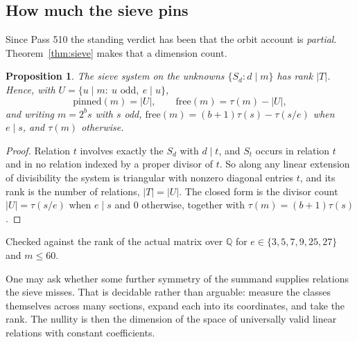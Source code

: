 \documentclass[11pt]{article}
\theoremstyle{plain}
\newtheorem{proposition}[theorem]{Proposition}
\theoremstyle{definition}
\newcommand{\QQ}{\mathbb Q}
\begin{document}
\subsection{How much the sieve pins}

Since Pass 510 the standing verdict has been that the orbit account is
\emph{partial}. Theorem~\ref{thm:sieve} makes that a dimension count.

\begin{proposition}\label{prop:rank}
The sieve system on the unknowns $\{S_d:d\mid m\}$ has rank $\lvert T\rvert$.
Hence, with $U=\{u\mid m:\ u \text{ odd},\ e\mid u\}$,
\[
\mathrm{pinned}(m)=\lvert U\rvert,\qquad
\mathrm{free}(m)=\tau(m)-\lvert U\rvert ,
\]
and writing $m=2^{b}s$ with $s$ odd,
$\mathrm{free}(m)=(b+1)\tau(s)-\tau(s/e)$ when $e\mid s$, and $\tau(m)$
otherwise.
\end{proposition}

\begin{proof}
Relation $t$ involves exactly the $S_d$ with $d\mid t$, and $S_t$ occurs in
relation $t$ and in no relation indexed by a proper divisor of $t$. So along
any linear extension of divisibility the system is triangular with nonzero
diagonal entries $t$, and its rank is the number of relations, $\lvert
T\rvert=\lvert U\rvert$. The closed form is the divisor count
$\lvert U\rvert=\tau(s/e)$ when $e\mid s$ and $0$ otherwise, together with
$\tau(m)=(b+1)\tau(s)$.
\end{proof}

\noindent Checked against the rank of the actual matrix over $\QQ$ for
$e\in\{3,5,7,9,25,27\}$ and $m\le60$.

One may ask whether some further symmetry of the summand supplies relations the
sieve misses. That is decidable rather than arguable: measure the classes
themselves across many sections, expand each into its coordinates, and take the
rank. The nullity is then the dimension of the space of universally valid
linear relations with constant coefficients.
\end{document}
